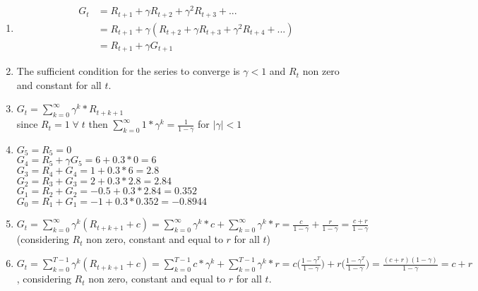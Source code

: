 \documentclass[11pt]{article}
\begin{document}
\begin{enumerate}[label=\alph*)]
	\item 
	\begin{equation}\begin{split}
	G_t & = R_{t+1} + \gamma R_{t+2} + \gamma^2 R_{t+3} + ... \\
	& = R_{t+1} + \gamma (R_{t+2} + \gamma R_{t+3} + \gamma^2 R_{t+4} + ...) \\
	& = R_{t+1} + \gamma G_{t+1}
	\end{split}
	\end{equation}
	\item The sufficient condition for the series to converge is $\gamma < 1$ and $R_t$ non zero and constant for all $t$.
	\item $G_t = \sum_{k=0}^{\infty} \gamma^k * R_{t+k+1}$ \\
	since $R_{t} = 1 \; \forall \; t$ then $\sum_{k=0}^{\infty} 1 * \gamma^k = \frac{1}{1-\gamma}$ for $|\gamma| < 1$
	\label{itm:smt}
	\item $G_5 = R_5 = 0$  \\
	$G_4 = R_5 + \gamma G_5 = 6 + 0.3*0 = 6$ \\
	$G_3 = R_4 + G_4 = 1 + 0.3*6 = 2.8$ \\
	$G_2 = R_3 + G_3 = 2 + 0.3*2.8 = 2.84$ \\
	$G_1 = R_2 + G_2 = -0.5 + 0.3*2.84 = 0.352$ \\
	$G_0 = R_1 + G_1 = -1 + 0.3*0.352 = -0.8944$
	\item $G_t = \sum_{k=0}^{\infty} \gamma^k (R_{t+k+1} + c) 
	= \sum_{k=0}^{\infty} \gamma^k * c + \sum_{k=0}^{\infty} \gamma^k * r  
	= \frac{c}{1-\gamma} + \frac{r}{1-\gamma} = \frac{c+r}{1-\gamma}$ 
	(considering $R_t$ non zero, constant and equal to $r$ for all $t$) 
	\item 
	$G_t = \sum_{k=0}^{T-1} \gamma^k (R_{t+k+1}+c) = \sum_{k=0}^{T-1} c*\gamma^k + \sum_{k=0}^{T-1} \gamma^k*r
	= c \Big( \frac{1-\gamma^T}{1-\gamma} \Big)+ r \Big( \frac{1-\gamma^T}{1-\gamma} \Big) = \frac{(c+r)(1-\gamma)}{1-\gamma} = c+r$, 
	considering $R_t$ non zero, constant and equal to $r$ for all $t$.
\end{enumerate}
\end{document}
